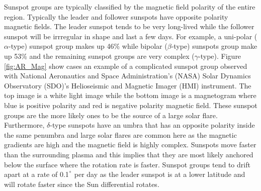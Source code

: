 	Sunspot groups are typically classified by the magnetic field polarity of the entire region.
	Typically the leader and follower sunspots have opposite polarity magnetic fields.
	The leader sunspot tends to be very long-lived while the follower sunspot will be irrregular in shape and last a few days.
	For example, a uni-polar ($\alpha$-type) sunspot group makes up 46\% while bipolar ($\beta$-type) sunspots group make up 53\% and the remaining sunspot groups are very complex ($\gamma$-type).
	Figure \ref{fig:AR_Mag} show cases an example of a complicated sunspot group observed with National Aeronautics and Space Administration's (NASA) Solar Dynamics Observatory (SDO)'s Helioseismic and Magnetic Imager (HMI) instrument.
	The top image is a white light image while the bottom image is a magnetogram where blue is positive polarity and red is negative polarity magnetic field.
	These sunspot groups are the more likely ones to be the source of a large solar flare.
	Furthermore, $\delta$-type sunspots have an umbra that has an opposite polarity inside the same penumbra and large solar flares are common here as the magnetic gradients are high and the magnetic field is highly complex.
	Sunspots move faster than the surrounding plasma and this implies that they are most likely anchored below the surface where the rotation rate is faster.
	Sunspot groups tend to drift apart at a rate of 0.1$^\degree$ per day as the leader sunspot is at a lower latitude and will rotate faster since the Sun differential rotates.
